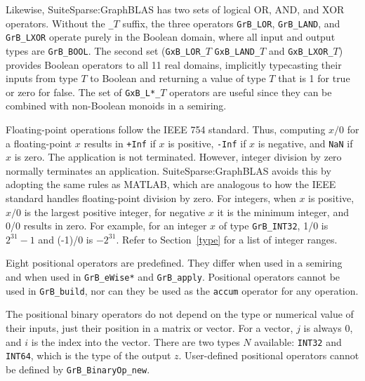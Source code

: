 \documentclass[12pt]{article}
\begin{document}
Likewise, SuiteSparse:GraphBLAS has two sets of logical OR, AND, and XOR
operators.  Without the \verb'_'$T$ suffix, the three operators \verb'GrB_LOR',
\verb'GrB_LAND', and \verb'GrB_LXOR' operate purely in the Boolean domain,
where all input and output types are \verb'GrB_BOOL'.  The second set
(\verb'GxB_LOR_'$T$ \verb'GxB_LAND_'$T$ and \verb'GxB_LXOR_'$T$) provides
Boolean operators to all 11 real domains, implicitly typecasting their inputs from
type $T$ to Boolean and returning a value of type $T$ that is 1 for true or
zero for false.  The set of \verb'GxB_L*_'$T$ operators are useful since they
can be combined with non-Boolean monoids in a semiring.

Floating-point operations follow the IEEE 754 standard.  Thus, computing $x/0$
for a floating-point $x$ results in \verb'+Inf' if $x$ is positive, \verb'-Inf'
if $x$ is negative, and \verb'NaN' if $x$ is zero.  The application is not
terminated.  However, integer division by zero normally terminates an
application.  SuiteSparse:GraphBLAS avoids this by adopting the same rules as
MATLAB, which are analogous to how the IEEE standard handles floating-point
division by zero.  For integers, when $x$ is positive, $x/0$ is the largest
positive integer, for negative $x$ it is the minimum integer, and 0/0 results
in zero.  For example, for an integer $x$ of type \verb'GrB_INT32', 1/0 is
$2^{31}-1$ and (-1)/0 is $-2^{31}$.  Refer to Section~\ref{type} for a list of
integer ranges.

Eight positional operators are predefined.  They differ when used in a semiring
and when used in \verb'GrB_eWise*' and \verb'GrB_apply'.  Positional operators
cannot be used in \verb'GrB_build', nor can they be used as the \verb'accum'
operator for any operation.

The positional binary operators do not depend on the type or numerical value of
their inputs, just their position in a matrix or vector.  For a vector, $j$ is
always 0, and $i$ is the index into the vector.  There are two types $N$
available: \verb'INT32' and \verb'INT64', which is the type of the output $z$.
User-defined positional operators cannot be defined by \verb'GrB_BinaryOp_new'.
\end{document}
